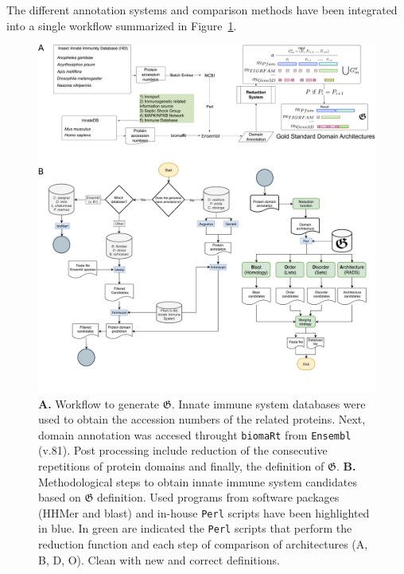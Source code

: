 \documentclass[11pt]{article}
\newcommand{\TODO}[1]{\begingroup\color{red}#1\endgroup}
\begin{document}
The different annotation systems and comparison methods have been integrated 
into a single workflow summarized in Figure~\ref{fig:workflow_golden}.

\begin{figure}[htb]
\begin{center}
\includegraphics[scale=0.17]{figures/completeALLWorkflow3}
\caption{\textbf{A.} Workflow to generate $\boldsymbol{\mathfrak{G}}$. Innate 
immune system databases were used to obtain the accession numbers of the 
related proteins. Next, domain annotation was accesed throught \texttt{biomaRt} 
from \texttt{Ensembl} (v.81). Post processing include reduction of the 
consecutive repetitions of protein domains and finally, the definition of 
$\boldsymbol{\mathfrak{G}}$. \textbf{B.} Methodological steps to obtain innate 
immune system candidates based on $\boldsymbol{\mathfrak{G}}$ definition. 
Used programs from software packages (HHMer and blast) and in-house 
\texttt{Perl} scripts have been highlighted in blue. In green are indicated the 
\texttt{Perl} scripts that perform the reduction function and each step of 
comparison of architectures (A, B, D, O). \TODO{Clean with new and correct 
definitions.}}  
\label{fig:workflow_golden}
\end{center}
\end{figure}
\end{document}
